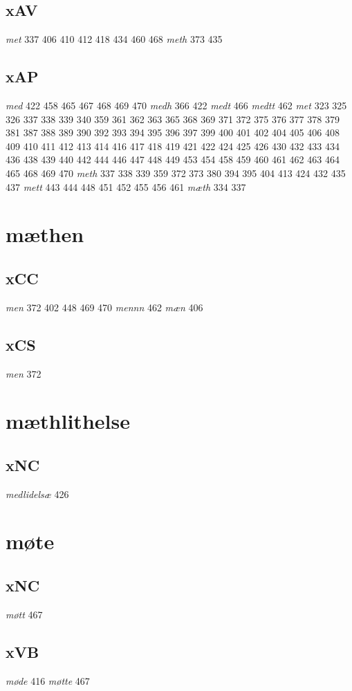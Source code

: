 \documentclass[a4paper,twocolumn]{article}
\begin{document}
\subsection{xAV}
\label{sec:org2e56986}
\emph{met} 337 406 410 412 418 434 460 468 \emph{meth} 373 435 
\subsection{xAP}
\label{sec:org526d70e}
\emph{med} 422 458 465 467 468 469 470 \emph{medh} 366 422 \emph{medt} 466 \emph{medtt} 462 \emph{met} 323 325 326 337 338 339 340 359 361 362 363 365 368 369 371 372 375 376 377 378 379 381 387 388 389 390 392 393 394 395 396 397 399 400 401 402 404 405 406 408 409 410 411 412 413 414 416 417 418 419 421 422 424 425 426 430 432 433 434 436 438 439 440 442 444 446 447 448 449 453 454 458 459 460 461 462 463 464 465 468 469 470 \emph{meth} 337 338 339 359 372 373 380 394 395 404 413 424 432 435 437 \emph{mett} 443 444 448 451 452 455 456 461 \emph{mæth} 334 337 
\section{mæthen}
\label{sec:org679423b}
\subsection{xCC}
\label{sec:orge9c4bdc}
\emph{men} 372 402 448 469 470 \emph{mennn} 462 \emph{mæn} 406 
\subsection{xCS}
\label{sec:org2f0c7e7}
\emph{men} 372 
\section{mæthlithelse}
\label{sec:org92fee3a}
\subsection{xNC}
\label{sec:org96ae544}
\emph{medlidelsæ} 426 
\section{møte}
\label{sec:org3fa99fc}
\subsection{xNC}
\label{sec:orgab99eef}
\emph{møtt} 467 
\subsection{xVB}
\label{sec:org574f26a}
\emph{møde} 416 \emph{møtte} 467 
\end{document}
